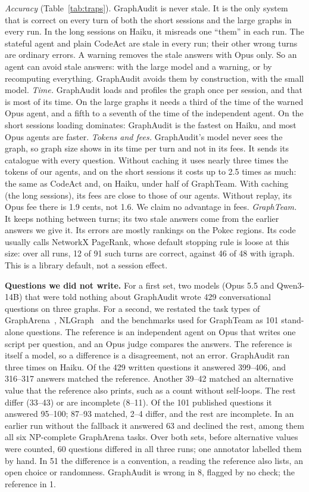\documentclass[sigconf,9pt]{acmart}
\newcommand{\sys}{GraphAudit}
\begin{document}
\emph{Accuracy} (Table~\ref{tab:traps}). \sys{} is never stale. It is the only system that is correct on
every turn of both the short sessions and the large graphs in every run. In the long sessions on Haiku, it
misreads one ``them'' in each run. The stateful agent and plain CodeAct are stale in every run; their
other wrong turns are ordinary errors. A warning removes the stale answers with Opus only.
So an agent can avoid stale answers: with the large model and a warning, or by recomputing everything.
\sys{} avoids them by construction, with the small model.
\emph{Time.} \sys{} loads and profiles the graph once per session, and that is most of its time. On the
large graphs it needs a third of the time of the warned Opus agent, and a fifth to a seventh of the time
of the independent agent. On the short sessions loading dominates: \sys{} is the fastest on Haiku, and most Opus agents are faster.
\emph{Tokens and fees.} \sys{}'s model never sees the graph, so graph size shows in its time per turn and not in its fees. It sends its catalogue with every question. Without caching it uses nearly three times the tokens of our agents, and on the short sessions it costs up to 2.5 times as much: the same
as CodeAct and, on Haiku, under half of GraphTeam. With caching (the long sessions), its fees are close to those of
our agents. Without replay, its Opus fee there is 1.9 cents, not 1.6. We claim no advantage
in fees.
\emph{GraphTeam.} It keeps nothing between turns; its two stale answers come from the earlier answers we give it. Its errors are mostly rankings on
the Pokec regions. Its code usually calls NetworkX PageRank, whose default stopping rule is loose at this
size: over all runs, 12 of 91 such turns are correct, against 46 of 48 with igraph. This is a library default,
not a session effect.

\textbf{Questions we did not write.} For a first set, two models (Opus 5.5
and Qwen3-14B) that were told nothing about \sys{} wrote 429 conversational questions on three graphs. For a second, we restated the task types of GraphArena~\cite{grapharena}, NLGraph~\cite{nlgraph} and the
benchmarks used for GraphTeam as 101 stand-alone questions. The reference is an independent agent on Opus
that writes one script per question, and an Opus judge compares the answers. The reference is itself a
model, so a difference is a disagreement, not an error. \sys{} ran three times on Haiku. Of the 429
written questions it answered 399--406, and 316--317 answers matched the reference. Another 39--42 matched an
alternative value that the reference also prints, such as a count without self-loops. The rest differ (33--43) or are incomplete (8--11). Of the 101 published questions it answered 95--100; 87--93 matched, 2--4 differ, and the rest are incomplete. In an
earlier run without the fallback it answered 63 and declined the rest, among them all six NP-complete
GraphArena tasks. Over both sets, before alternative values were counted, 60 questions differed in all three runs; one annotator labelled
them by hand. In 51 the difference is a convention, a reading the reference also lists, an open choice or randomness. \sys{} is wrong in 8, flagged by no check; the reference in 1.
\end{document}
